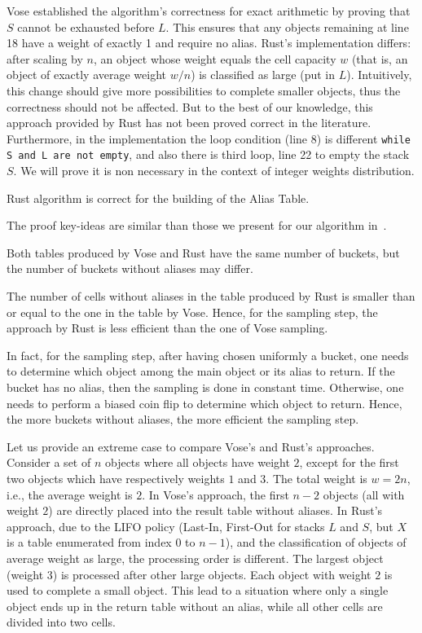 Vose established the algorithm's correctness for exact arithmetic by proving that $S$ cannot be exhausted before $L$. 
This ensures that any objects remaining at line 18 have a weight of exactly 1 and require no alias. 
Rust's implementation differs: after scaling by $n$, an object whose weight equals the cell capacity $w$ (that is, an object of exactly average weight $w/n$) is classified as large (put in $L$). Intuitively,
this change should give more possibilities to complete smaller objects, thus the correctness
should not be affected.
But to the best of our knowledge, this approach provided by Rust has not been proved correct in the literature.
Furthermore, in the implementation the loop condition (line 8) is different \texttt{while S and L are not empty}, and also there is third loop, line 22 to empty the stack $S$.
We will prove it is non necessary in the context of integer weights distribution.

\begin{proposition}
    Rust algorithm is correct for the building of the Alias Table.
\end{proposition}
The proof key-ideas are similar than those we present for our algorithm in~.

Both tables produced by Vose and Rust have the same number of buckets, but the number of buckets without aliases may differ.
\begin{proposition}
    The number of cells without aliases in the table produced by Rust is smaller than or equal to the one 
    in the table by Vose. Hence, for the sampling step, the approach by Rust is less efficient than the one of Vose sampling.
\end{proposition}
In fact, for the sampling step, after having chosen uniformly a bucket, one needs to determine which object among the main object or its alias to return. If the bucket has no alias, then the sampling is done in constant time. Otherwise, one needs to perform a biased coin flip to determine which object to return. Hence, the more buckets without aliases, the more efficient the sampling step.

Let us provide an extreme case to compare Vose's and Rust's approaches.
Consider a set of $n$ objects where all objects have weight $2$, except for the first two objects which have respectively weights $1$ and $3$. The total weight is $w=2n$, i.e., the average weight is $2$.
In Vose's approach, the first $n-2$ objects (all with weight $2$) are directly placed into the result table without aliases.
In Rust's approach, due to the LIFO policy (Last-In, First-Out for stacks $L$ and $S$, but $X$ is a table enumerated from 
index $0$ to $n-1$), and the classification of objects of average weight as large, the processing order is different. 
The largest object (weight $3$) is processed after other large objects. Each object with weight $2$ is used to complete a small object.
This lead to a situation where only a single object ends up in the return table without an alias, while all other cells are divided into two cells.

